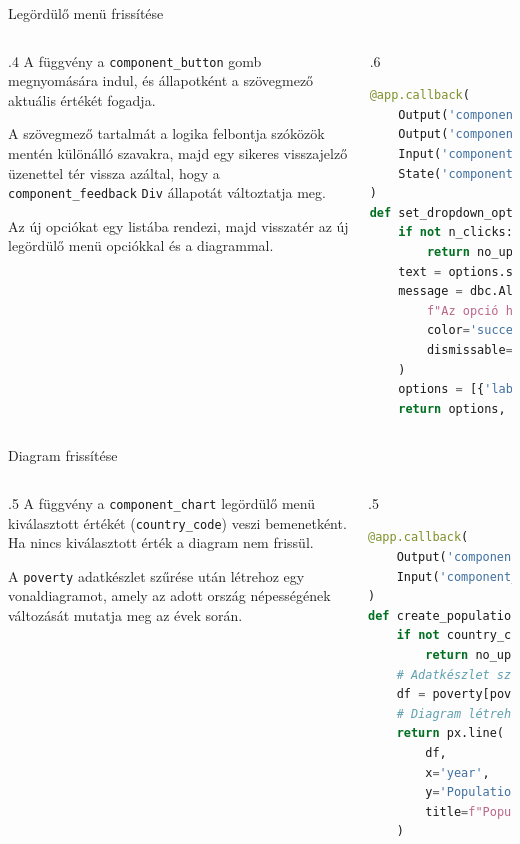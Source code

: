 \documentclass[english, aspectratio=169]{beamer}
\begin{document}
\begin{frame}[fragile]{Legördülő menü frissítése}
	\begin{columns}
		\begin{column}{.4\textwidth}
			A függvény a \texttt{component\_button} gomb megnyomására indul, és állapotként a szövegmező aktuális értékét fogadja.\par\smallskip
			A szövegmező tartalmát a logika felbontja szóközök mentén különálló szavakra, majd egy sikeres visszajelző üzenettel tér vissza azáltal, hogy a \texttt{component\_feedback} \texttt{Div} állapotát változtatja meg.\par\smallskip
			Az új opciókat egy listába rendezi, majd visszatér az új legördülő menü opciókkal és a diagrammal. 
		\end{column}
		\begin{column}{.6\textwidth}
			\begin{lstlisting}[language=python]
@app.callback(
	Output('component_dropdown', 'options'),
	Output('component_feedback', 'children'),
	Input('component_button', 'n_clicks'),
	State('component_text', 'value')
)
def set_dropdown_options(n_clicks, options):
	if not n_clicks:
		return no_update
	text = options.split()
	message = dbc.Alert(
		f"Az opció hozzáadása sikeresen megtörtént: {','.join(text)}",
		color='success',
		dismissable=True
	)
	options = [{'label': t, 'value': t} for t in text]
	return options, message
			\end{lstlisting}
		\end{column}
	\end{columns}
\end{frame}

\begin{frame}[fragile]{Diagram frissítése}
	\begin{columns}
		\begin{column}{.5\textwidth}
			A függvény a \texttt{component\_chart}  legördülő menü kiválasztott értékét (\texttt{country\_code}) veszi bemenetként. Ha nincs kiválasztott érték a diagram nem frissül.\par\smallskip
			A \texttt{poverty} adatkészlet szűrése után létrehoz egy vonaldiagramot, amely az adott ország népességének változását mutatja meg az évek során.
		\end{column}
		\begin{column}{.5\textwidth}
			\begin{lstlisting}[language=python]
@app.callback(
	Output('component_chart', 'figure'),
	Input('component_dropdown', 'value')
)
def create_population_chart(country_code):
	if not country_code:
		return no_update
	# Adatkészlet szűrése
	df = poverty[poverty['Country Code'] == country_code]
	# Diagram létrehozása
	return px.line(
		df,
		x='year',
		y='Population, total',
		title=f"Population of {country_code}"
	)
			\end{lstlisting}
		\end{column}
	\end{columns}
\end{frame}
\end{document}
